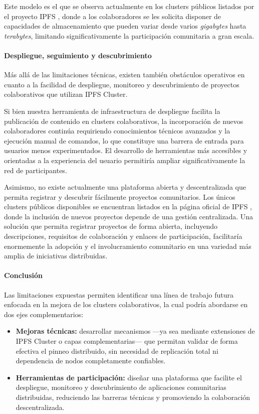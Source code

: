 Este modelo es el que se observa actualmente en los clusters públicos listados por el proyecto IPFS \cite{collaborative-clusters}, donde a los colaboradores se les solicita disponer de capacidades de almacenamiento que pueden variar desde varios \textit{gigabytes} hasta \textit{terabytes}, limitando significativamente la participación comunitaria a gran escala.

\paragraph{Despliegue, seguimiento y descubrimiento}

Más allá de las limitaciones técnicas, existen también obstáculos operativos en cuanto a la facilidad de despliegue, monitoreo y descubrimiento de proyectos colaborativos que utilizan IPFS Cluster.

Si bien nuestra herramienta de infraestructura de despliegue facilita la publicación de contenido en clusters colaborativos, la incorporación de nuevos colaboradores continúa requiriendo conocimientos técnicos avanzados y la ejecución manual de comandos, lo que constituye una barrera de entrada para usuarios menos experimentados. El desarrollo de herramientas más accesibles y orientadas a la experiencia del usuario permitiría ampliar significativamente la red de participantes.

Asimismo, no existe actualmente una plataforma abierta y descentralizada que permita registrar y descubrir fácilmente proyectos comunitarios. Los únicos clusters públicos disponibles se encuentran listados en la página oficial de IPFS \cite{collaborative-clusters}, donde la inclusión de nuevos proyectos depende de una gestión centralizada. Una solución que permita registrar proyectos de forma abierta, incluyendo descripciones, requisitos de colaboración y enlaces de participación, facilitaría enormemente la adopción y el involucramiento comunitario en una variedad más amplia de iniciativas distribuidas.

\paragraph{Conclusión}

Las limitaciones expuestas permiten identificar una línea de trabajo futura enfocada en la mejora de los clusters colaborativos, la cual podría abordarse en dos ejes complementarios:

\begin{itemize}
    \item \textbf{Mejoras técnicas:} desarrollar mecanismos —ya sea mediante extensiones de IPFS Cluster o capas complementarias— que permitan validar de forma efectiva el pinneo distribuido, sin necesidad de replicación total ni dependencia de nodos completamente confiables.
    \item \textbf{Herramientas de participación:} diseñar una plataforma que facilite el despliegue, monitoreo y descubrimiento de aplicaciones comunitarias distribuidas, reduciendo las barreras técnicas y promoviendo la colaboración descentralizada.
\end{itemize}

